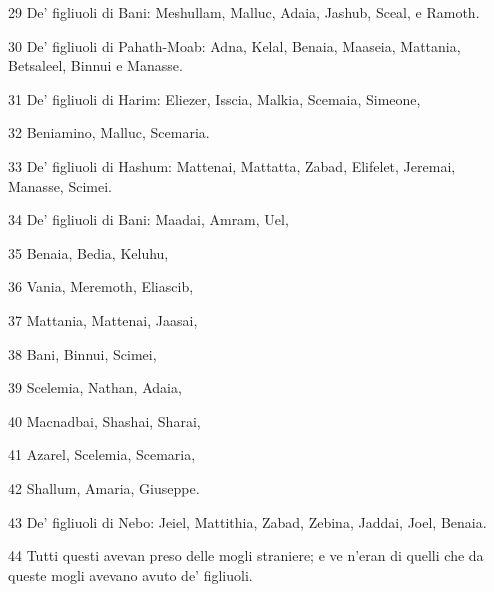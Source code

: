 \par 29 De' figliuoli di Bani: Meshullam, Malluc, Adaia, Jashub, Sceal, e Ramoth.
\par 30 De' figliuoli di Pahath-Moab: Adna, Kelal, Benaia, Maaseia, Mattania, Betsaleel, Binnui e Manasse.
\par 31 De' figliuoli di Harim: Eliezer, Isscia, Malkia, Scemaia, Simeone,
\par 32 Beniamino, Malluc, Scemaria.
\par 33 De' figliuoli di Hashum: Mattenai, Mattatta, Zabad, Elifelet, Jeremai, Manasse, Scimei.
\par 34 De' figliuoli di Bani: Maadai, Amram, Uel,
\par 35 Benaia, Bedia, Keluhu,
\par 36 Vania, Meremoth, Eliascib,
\par 37 Mattania, Mattenai, Jaasai,
\par 38 Bani, Binnui, Scimei,
\par 39 Scelemia, Nathan, Adaia,
\par 40 Macnadbai, Shashai, Sharai,
\par 41 Azarel, Scelemia, Scemaria,
\par 42 Shallum, Amaria, Giuseppe.
\par 43 De' figliuoli di Nebo: Jeiel, Mattithia, Zabad, Zebina, Jaddai, Joel, Benaia.
\par 44 Tutti questi avevan preso delle mogli straniere; e ve n'eran di quelli che da queste mogli avevano avuto de' figliuoli.


